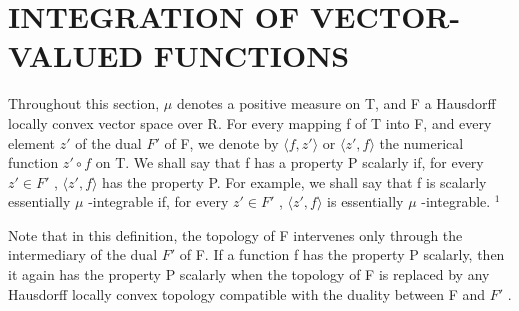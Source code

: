 \section{INTEGRATION OF VECTOR-VALUED FUNCTIONS}

Throughout this section, \(\mu\) denotes a positive measure on T, and F a Hausdorff locally convex vector space over R. For every mapping f of T into F, and every element \(z'\) of the dual \(F'\) of F, we denote by \(\langle f, z' \rangle\) or \(\langle z', f \rangle\) the numerical function \(z' \circ f\) on T. We shall say that f has a property P scalarly if, for every \(z' \in F'\) , \(\langle z', f \rangle\) has the property P. For example, we shall say that f is scalarly essentially \(\mu\) -integrable if, for every \(z' \in F'\) , \(\langle z', f \rangle\) is essentially \(\mu\) -integrable. \(^{1}\)

Note that in this definition, the topology of F intervenes only through the intermediary of the dual \(F'\) of F. If a function f has the property P scalarly, then it again has the property P scalarly when the topology of F is replaced by any Hausdorff locally convex topology compatible with the duality between F and \(F'\) .

